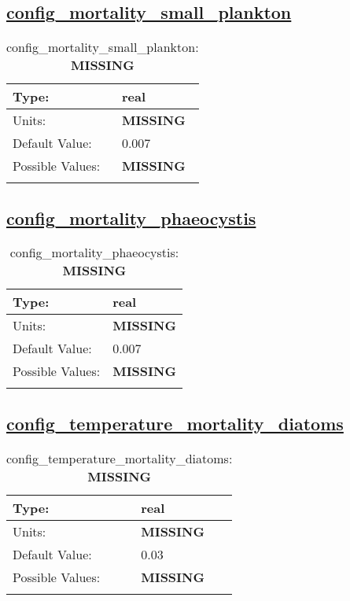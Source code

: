 \subsection[config\_mortality\_small\_plankton]{\hyperref[sec:nm_tab_biogeochemistry]{config\_mortality\_small\_plankton}}
\label{subsec:nm_sec_config_mortality_small_plankton}
\begin{center}
\begin{longtable}{| p{2.0in} || p{4.0in} |}
    \hline
    Type: & real \\
    \hline
    Units: & {\bf \color{red} MISSING} \\
    \hline
    Default Value: & 0.007 \\
    \hline
    Possible Values: & {\bf \color{red} MISSING} \\
    \hline
    \caption{config\_mortality\_small\_plankton: {\bf \color{red} MISSING}}
\end{longtable}
\end{center}
\subsection[config\_mortality\_phaeocystis]{\hyperref[sec:nm_tab_biogeochemistry]{config\_mortality\_phaeocystis}}
\label{subsec:nm_sec_config_mortality_phaeocystis}
\begin{center}
\begin{longtable}{| p{2.0in} || p{4.0in} |}
    \hline
    Type: & real \\
    \hline
    Units: & {\bf \color{red} MISSING} \\
    \hline
    Default Value: & 0.007 \\
    \hline
    Possible Values: & {\bf \color{red} MISSING} \\
    \hline
    \caption{config\_mortality\_phaeocystis: {\bf \color{red} MISSING}}
\end{longtable}
\end{center}
\subsection[config\_temperature\_mortality\_diatoms]{\hyperref[sec:nm_tab_biogeochemistry]{config\_temperature\_mortality\_diatoms}}
\label{subsec:nm_sec_config_temperature_mortality_diatoms}
\begin{center}
\begin{longtable}{| p{2.0in} || p{4.0in} |}
    \hline
    Type: & real \\
    \hline
    Units: & {\bf \color{red} MISSING} \\
    \hline
    Default Value: & 0.03 \\
    \hline
    Possible Values: & {\bf \color{red} MISSING} \\
    \hline
    \caption{config\_temperature\_mortality\_diatoms: {\bf \color{red} MISSING}}
\end{longtable}
\end{center}
